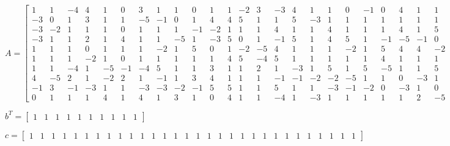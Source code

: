 \documentclass[8pt]{article}
\begin{document}
\small
$ A =
\begin{bmatrix}
  1  &  1  & -4  &  4  &  1  &  0  &  3  &  1  &  1  &  0  &  1  &  1  & -2  &  3  & -3  &  4  &  1  &  1  &  0  & -1  &  0  &  4  &  1  &  1  &  1  &  2  & -3  &  0  & -4  & -1 \\
 -3  &  0  &  1  &  3  &  1  &  1  & -5  & -1  &  0  &  1  &  4  &  4  &  5  &  1  &  1  &  5  & -3  &  1  &  1  &  1  &  1  &  1  &  1  &  1  &  3  & -5  &  0  &  1  &  3  &  1 \\
 -3  & -2  &  1  &  1  &  1  &  0  &  1  &  1  &  1  & -1  & -2  &  1  &  1  &  1  &  4  &  1  &  1  &  4  &  1  &  1  &  1  &  4  &  1  &  5  &  0  &  3  & -5  &  1  &  1  &  1 \\
 -3  &  1  &  1  &  2  &  1  &  4  &  1  &  1  & -5  &  1  & -3  &  5  &  0  &  1  & -1  &  5  &  1  &  4  &  5  &  1  & -1  & -5  & -1  &  0  &  1  &  2  &  1  &  3  & -3  &  2 \\
  1  &  1  &  1  &  0  &  1  &  1  &  1  & -2  &  1  &  5  &  0  &  1  & -2  & -5  &  4  &  1  &  1  &  1  & -2  &  1  &  5  &  4  &  4  & -2  &  1  &  1  &  4  &  1  & -1  & -1 \\
  1  &  1  &  1  & -2  &  1  &  0  &  1  &  1  &  1  &  1  &  1  &  4  &  5  & -4  &  5  &  1  &  1  &  1  &  1  &  1  &  4  &  1  &  1  &  1  & -5  &  1  &  1  &  5  & -5  &  3 \\
  1  &  1  & -4  &  1  & -5  & -1  & -4  &  5  &  1  &  1  &  3  &  1  &  1  &  2  &  1  & -3  &  1  &  5  &  1  &  5  & -5  &  1  &  1  &  5  &  3  &  3  & -1  &  2  &  5  &  2 \\
  4  & -5  &  2  &  1  & -2  &  2  &  1  & -1  &  1  &  3  &  4  &  1  &  1  &  1  & -1  & -1  & -2  & -2  & -5  &  1  &  1  &  0  & -3  &  1  &  5  &  1  &  1  &  1  & -5  &  5 \\
 -1  &  3  & -1  & -3  &  1  &  1  & -3  & -3  & -2  & -1  &  5  &  5  &  1  &  1  &  5  &  1  &  1  & -3  & -1  & -2  &  0  & -3  &  1  &  0  &  1  &  0  &  2  &  1  &  1  &  1 \\
  0  &  1  &  1  &  1  &  4  &  1  &  4  &  1  &  3  &  1  &  0  &  4  &  1  &  1  & -4  &  1  & -3  &  1  &  1  &  1  &  1  &  1  &  2  & -5  & -1  &  4  & -5  &  1  & -3  &  1 
\end{bmatrix}
$


\small
$ b^T =
\begin{bmatrix}
  1  &  1  &  1  &  1  &  1  &  1  &  1  &  1  &  1  &  1 
\end{bmatrix}
$


\small
$ c =
\begin{bmatrix}
  1  &  1  &  1  &  1  &  1  &  1  &  1  &  1  &  1  &  1  &  1  &  1  &  1  &  1  &  1  &  1  &  1  &  1  &  1  &  1  &  1  &  1  &  1  &  1  &  1  &  1  &  1  &  1  &  1  &  1 
\end{bmatrix}
$
\end{document}
